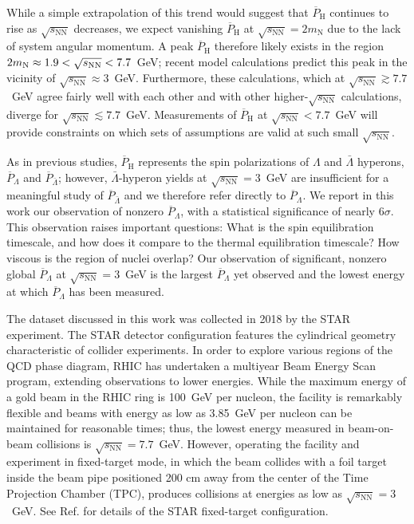 \documentclass[
  reprint,
  superscriptaddress,
  amsmath,
  amssymb,
  aps,
  floatfix,
]{revtex4-2}
\newcommand{\sNN}{\sqrt{s_\mathrm{NN}}}
\newcommand{\PLambda}{\overline{P}_{\Lambda}}
\newcommand{\PLamBar}{\overline{P}_{\bar{\Lambda}}}
\newcommand{\PHyper}{\overline{P}_\mathrm{H}}
\begin{document}
While a simple extrapolation of this
 trend would suggest that $\PHyper$ continues
 to rise as $\sNN$ decreases, we
 expect vanishing $\PHyper$ at $\sNN=2m_\mathrm{N}$ due
 to the lack of system angular
 momentum\cite{Deng:2020ygd}. A peak $\PHyper$ therefore likely
 exists in the region $2m_{\rm N}\approx1.9<\sNN<7.7$~GeV;
 recent model calculations predict this peak
 in the vicinity of $\sNN\approx3$~GeV\cite{Deng:2020ygd,Ivanov:2019ern,guo2021locating}. Furthermore,
 these calculations, which at $\sNN\gtrsim7.7$~GeV agree
 fairly well with each other and
 with other higher-$\sNN$ calculations\cite{Li:2017slc,Vitiuk:2019rfv,Sun:2017xhx,Ivanov:2019ern,Karpenko:2016jyx}, diverge for
 $\sNN\lesssim7.7$~GeV. Measurements of $\PHyper$ at $\sNN<7.7$~GeV
 will provide constraints on which sets
 of assumptions are valid at such
 small $\sNN$.

As in previous studies, $\PHyper$ represents
 the spin polarizations of $\Lambda$
 and $\bar{\Lambda}$ hyperons, $\PLambda$ and $\PLamBar$;
 however, $\bar{\Lambda}$-hyperon yields at $\sNN=3$~GeV are
 insufficient for a meaningful study
 of $\PLamBar$ and we therefore refer directly to $\PLambda$.
 We report in this work our
 observation of nonzero $\PLambda$, with a
 statistical significance of nearly $6\sigma$. This
 observation raises important questions:
 What is the spin equilibration timescale,
 and how does it compare to
 the thermal equilibration timescale? How viscous
 is the region of nuclei overlap?
 Our observation of significant, nonzero global
 $\PLambda$ at $\sNN=3$~GeV is the
 largest $\PLambda$ yet observed and the
 lowest energy at which $\PLambda$ has
 been measured.

The dataset discussed in this work
 was collected in 2018 by the
 STAR experiment\cite{Ackermann:2002ad}. The STAR detector configuration
 features the cylindrical geometry characteristic of
 collider experiments. In order to explore
 various regions of the QCD phase
 diagram, RHIC has undertaken a multiyear
 Beam Energy Scan\cite{Aggarwal:2010cw} program, extending observations
 to lower energies. While the maximum
 energy of a gold beam in
 the RHIC ring is 100~GeV per
 nucleon, the facility is remarkably flexible
 and beams with energy as low
 as 3.85~GeV per nucleon can be
 maintained for reasonable times; thus, the
 lowest energy measured in beam-on-beam collisions
 is $\sNN=7.7$~GeV. However, operating the facility
 and experiment in fixed-target mode, in
 which the beam collides with a
 foil target inside the beam pipe
 positioned 200 cm away from the center
 of the Time Projection Chamber (TPC), produces collisions at
 energies as low as $\sNN=3$~GeV. See Ref. \cite{STAR:2020dav}
 for details of the STAR fixed-target configuration.
\end{document}

